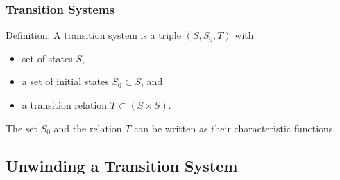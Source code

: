 
\begin{frame}
\frametitle{Transition Systems}

Definition: A transition system is a triple $(S, S_0, T)$ with
%
\begin{itemize}
\item set of states $S$,
\item a set of initial states $S_0\subset S$, and
\item a transition relation $T \subset (S\times S)$.
\end{itemize}
\vfill

The set $S_0$ and the relation $T$ can be written as
their characteristic functions.

\end{frame}


\subsection{Unwinding a Transition System}

